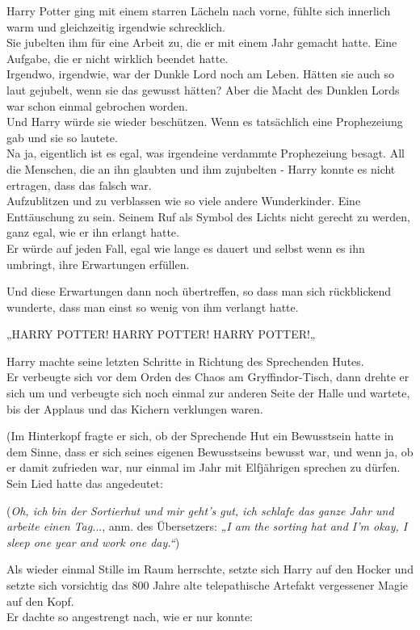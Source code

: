 {Harry Potter ging mit einem starren Lächeln nach vorne, fühlte sich innerlich warm und gleichzeitig irgendwie schrecklich.\\ Sie jubelten ihm für eine Arbeit zu, die er mit einem Jahr gemacht hatte. Eine Aufgabe, die er nicht wirklich beendet hatte.\\ Irgendwo, irgendwie, war der Dunkle Lord noch am Leben. Hätten sie auch so laut gejubelt, wenn sie das gewusst hätten? Aber die Macht des Dunklen Lords war schon einmal gebrochen worden.\\ Und Harry würde sie wieder beschützen. Wenn es tatsächlich eine Prophezeiung gab und sie so lautete.\\ Na ja, eigentlich ist es egal, was irgendeine verdammte Prophezeiung besagt. All die Menschen, die an ihn glaubten und ihm zujubelten - Harry konnte es nicht ertragen, dass das falsch war.\\ Aufzublitzen und zu verblassen wie so viele andere Wunderkinder. Eine Enttäuschung zu sein. Seinem Ruf als Symbol des Lichts nicht gerecht zu werden, ganz egal, wie er ihn erlangt hatte.\\ Er würde auf jeden Fall, egal wie lange es dauert und selbst wenn es ihn umbringt, ihre Erwartungen erfüllen.

Und diese Erwartungen dann noch übertreffen, so dass man sich rückblickend wunderte, dass man einst so wenig von ihm verlangt hatte.

„HARRY POTTER! HARRY POTTER! HARRY POTTER!„

Harry machte seine letzten Schritte in Richtung des Sprechenden Hutes.\\ Er verbeugte sich vor dem Orden des Chaos am Gryffindor-Tisch, dann drehte er sich um und verbeugte sich noch einmal zur anderen Seite der Halle und wartete, bis der Applaus und das Kichern verklungen waren.

(Im Hinterkopf fragte er sich, ob der Sprechende Hut ein Bewusstsein hatte in dem Sinne, dass er sich seines eigenen Bewusstseins bewusst war, und wenn ja, ob er damit zufrieden war, nur einmal im Jahr mit Elfjährigen sprechen zu dürfen.\\ Sein Lied hatte das angedeutet:

(\emph{Oh, ich bin der Sortierhut und mir geht's gut, ich schlafe das ganze Jahr und arbeite einen Tag.}.., anm. des Übersetzers: \emph{„I am the sorting hat and I'm okay, I sleep one year and work one day.“})

Als wieder einmal Stille im Raum herrschte, setzte sich Harry auf den Hocker und setzte sich vorsichtig das 800 Jahre alte telepathische Artefakt vergessener Magie auf den Kopf.\\ Er dachte so angestrengt nach, wie er nur konnte:

}
